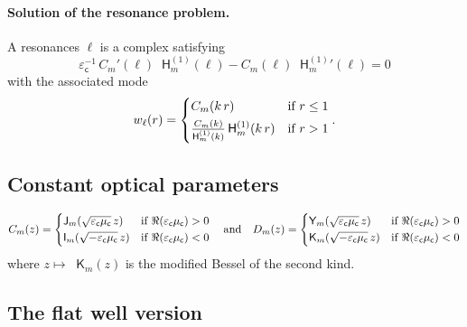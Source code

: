\documentclass[12pt,a4paper]{article}
\theoremstyle{definition}
\theoremstyle{plain}
\theoremstyle{remark}
\newcommand{\bJ}{\mathop{}\!\mathsf{J}}
\newcommand{\bY}{\mathop{}\!\mathsf{Y}}
\newcommand{\Hu}{\mathop{}\!\mathsf{H}^{(1)}}
\newcommand{\bI}{\mathop{}\!\mathsf{I}}
\newcommand{\bK}{\mathop{}\!\mathsf{K}}
\newcommand{\ecav}{\varepsilon_\mathsf{c}}
\newcommand{\mcav}{\mu_\mathsf{c}}
\begin{document}
\paragraph{Solution of the resonance problem.}
A resonances $\ell$ is a complex satisfying
\begin{equation}
    \ecav^{-1}\, C_m'(\ell) \Hu_m(\ell) - C_m(\ell) {\Hu_m}'(\ell) = 0
\end{equation}
with the associated mode
\begin{equation}
    w_\ell(r) = \begin{dcases}
        C_m(k\, r)                           & \text{if } r \le 1 \\
        \tfrac{C_m(k)}{\Hu_m(k)}\Hu_m(k\, r) & \text{if } r > 1
    \end{dcases}.
\end{equation}

\subsection{Constant optical parameters}

\[
    C_m(z) = \begin{dcases}
        \bJ_m(\sqrt{\ecav\mcav}\, z)  & \text{if } \Re(\ecav\mcav) > 0 \\
        \bI_m(\sqrt{-\ecav\mcav}\, z) & \text{if } \Re(\ecav\mcav) < 0
    \end{dcases} \quad
    \text{and} \quad
    D_m(z) = \begin{dcases}
        \bY_m(\sqrt{\ecav\mcav}\, z)  & \text{if } \Re(\ecav\mcav) > 0 \\
        \bK_m(\sqrt{-\ecav\mcav}\, z) & \text{if } \Re(\ecav\mcav) < 0
    \end{dcases}
\]
where $z \mapsto \bK_m(z)$ is the modified Bessel of the second kind.

\subsection{The flat well version}
\end{document}
